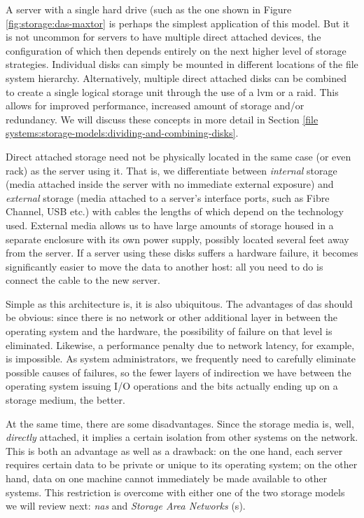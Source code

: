 A server with a single hard drive (such as the one
shown in Figure \ref{fig:storage:das-maxtor} is
perhaps the simplest application of this model.  But
it is not uncommon for servers to have multiple direct
attached devices, the configuration of which then
depends entirely on the next higher level of storage
strategies.  Individual disks can simply be mounted in
different locations of the file system hierarchy.
Alternatively, multiple direct attached disks can be
combined to create a single logical storage unit
through the use of a \gls{lvm} or a \gls{raid}.  This allows for
improved performance, increased amount of storage
and/or redundancy.  We will discuss these concepts in
more detail in Section \ref{file
systems:storage-models:dividing-and-combining-disks}.

Direct attached storage need not be physically located
in the same case (or even rack) as the server using
it.  That is, we differentiate between {\em internal}
storage (media attached inside the server with no
immediate external exposure) and {\em external}
storage (media attached to a server's interface ports,
such as Fibre Channel,
USB etc.) with cables the lengths of which
depend on the technology used.  External media allows
us to have large amounts of storage housed in a
separate enclosure with its own power supply, possibly
located several feet away from the server.  If a
server using these disks suffers a hardware failure,
it becomes significantly easier to move the data to
another host: all you need to do is connect the cable
to the new server.

Simple as this architecture is, it is also ubiquitous.
The advantages of \gls{das} should be obvious: since there
is no network or other additional layer in between the
operating system and the hardware, the possibility of
failure on that level is eliminated.  Likewise, a
performance penalty due to network latency, for
example, is impossible.  As system administrators, we
frequently need to carefully eliminate possible causes
of failures, so the fewer layers of indirection we
have between the operating system issuing I/O
operations and the bits actually ending up on a
storage medium, the better.

At the same time, there are some disadvantages.  Since
the storage media is, well, {\em directly} attached,
it implies a certain isolation from other systems on
the network.  This is both an advantage as well as a
drawback: on the one hand, each server requires
certain data to be private or unique to its operating
system; on the other hand, data on one machine
cannot immediately be made available to other systems.
This restriction is overcome with either one of the
two storage models we will review next: {\em \gls{nas}}
and {\em Storage Area Networks} (s).


